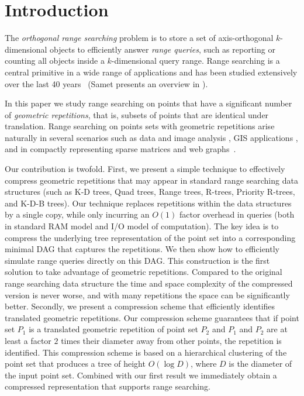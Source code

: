 \section{Introduction}
The \emph{orthogonal range searching} problem is to store a set of axis-orthogonal $k$-dimensional objects to efficiently answer \emph{range queries}, such as reporting or counting all objects inside a $k$-dimensional query range. Range searching is a central primitive in a wide range of applications and has been studied extensively over the last 40 years~\cite{bentley1975multidimensional, bentley1979multidimensional, orenstein1982multidimensional, bentley1980decomposable, lueker1978data, lee1980quintary, guttman1984r, clarkson1983fast, kanth1999optimal, van1991dividedk, gaede1998multidimensional, bayer1972organization, arge2008priority, robinson1981kdb, procopiuc2003bkd, comer1979ubiquitous, eppstein2008skip} (Samet presents an overview in \cite{samet1990applications}). 

In this paper we study range searching on points that have a significant number of \emph{geometric repetitions}, that is, subsets of points that are identical under translation. Range searching on points sets with geometric repetitions arise naturally in several scenarios such as data and image analysis \cite{tetko2001pattern, pajarola2000image, dick2009a}, GIS applications \cite{schindler2008detecting, zhu2002efficient, haegler2010a, dick2009a}, and in compactly representing sparse matrices and web graphs~\cite{Galli98compressionof, brisaboa2009k2, brisaboaainterleaved, de2013compact}.

Our contribution is twofold. 
First, we present a simple technique to effectively compress geometric repetitions that may appear in standard range searching data structures (such as K-D trees, Quad trees, Range trees, R-trees, Priority R-trees, and K-D-B trees). Our technique replaces repetitions within the data structures by a single copy, while only incurring an $O(1)$ factor overhead in queries (both in standard RAM model and I/O model of computation). The key idea is to compress the underlying tree representation of the point set into a corresponding minimal DAG that captures the repetitions. We then show how to efficiently simulate range queries directly on this DAG. This construction is the first solution to take advantage of geometric repetitions. Compared to the original range searching data structure the time and space complexity of the compressed version is never worse, and with many repetitions the space can be significantly better. 
Secondly, we present a compression scheme that efficiently identifies translated geometric repetitions. Our compression scheme guarantees that if point set $P_1$ is a translated geometric repetition of point set $P_2$ and $P_1$ and $P_2$ are at least a factor $2$ times their diameter away from other points, the repetition is identified. This compression scheme is based on a hierarchical clustering of the point set that produces a tree of height $O(\log D)$, where $D$ is the diameter of the input point set. Combined with our first result we immediately obtain a compressed representation that supports range searching. 


